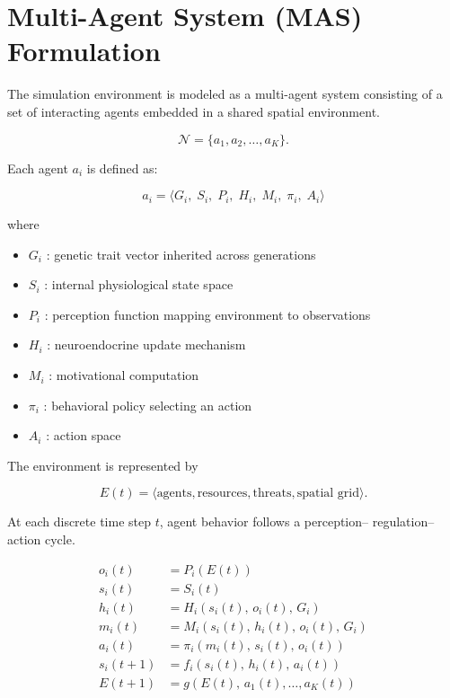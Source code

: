 
% 



\section{Multi-Agent System (MAS) Formulation}

The simulation environment is modeled as a multi-agent system consisting of
a set of interacting agents embedded in a shared spatial environment.

\[
\mathcal{N} = \{ a_1, a_2, \dots, a_K \}.
\]

Each agent \(a_i\) is defined as:

\[
a_i =
\langle
G_i,\;
S_i,\;
P_i,\;
H_i,\;
M_i,\;
\pi_i,\;
A_i
\rangle
\]

where

\begin{itemize}
\item \(G_i\) : genetic trait vector inherited across generations
\item \(S_i\) : internal physiological state space
\item \(P_i\) : perception function mapping environment to observations
\item \(H_i\) : neuroendocrine update mechanism
\item \(M_i\) : motivational computation
\item \(\pi_i\) : behavioral policy selecting an action
\item \(A_i\) : action space
\end{itemize}

The environment is represented by

\[
E(t) =
\langle
\text{agents},
\text{resources},
\text{threats},
\text{spatial grid}
\rangle .
\]

At each discrete time step \(t\), agent behavior follows a perception–
regulation–action cycle.

\[
\begin{aligned}
o_i(t) &= P_i(E(t)) \\
s_i(t) &= S_i(t) \\
h_i(t) &= H_i(s_i(t),\, o_i(t),\, G_i) \\
m_i(t) &= M_i(s_i(t),\, h_i(t),\, o_i(t),\, G_i) \\
a_i(t) &= \pi_i(m_i(t),\, s_i(t),\, o_i(t)) \\
s_i(t+1) &= f_i(s_i(t),\, h_i(t),\, a_i(t)) \\
E(t+1) &= g(E(t),\, a_1(t),\dots,a_K(t))
\end{aligned}
\]

